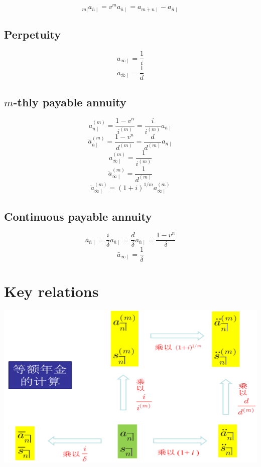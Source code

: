 \documentclass[
]{book}
\begin{document}
\[_{m|}a_{\overline{n}\mid}=v^ma_{\overline{n}\mid}=a_{\overline{m+n}\mid}-a_{\overline{n}\mid}\]

\hypertarget{perpetuity}{%
\subsection*{Perpetuity}\label{perpetuity}}

\[a_{\overline{\infty}\mid}=\frac{1}{i}\]
\[\ddot{a}_{\overline{\infty}\mid}=\frac{1}{d}\]

\hypertarget{m-thly-payable-annuity}{%
\subsection*{\texorpdfstring{\(m\)-thly payable annuity}{m-thly payable annuity}}\label{m-thly-payable-annuity}}

\[a^{(m)}_{\overline{n}\mid}=\frac{1-v^n}{i^{(m)}}=\frac{i}{i^{(m)}}a_{\overline{n}\mid}\]
\[\ddot{a}^{(m)}_{\overline{n}\mid}=\frac{1-v^n}{d^{(m)}}=\frac{d}{d^{(m)}}a_{\overline{n}\mid}\]
\[a^{(m)}_{\overline{\infty}\mid}=\frac{1}{i^{(m)}}\]
\[\ddot{a}^{(m)}_{\overline{\infty}\mid}=\frac{1}{d^{(m)}}\]
\[\ddot{a}^{(m)}_{\overline{\infty}\mid}=(1+i)^{1/m}a^{(m)}_{\overline{\infty}\mid}\]

\hypertarget{continuous-payable-annuity}{%
\subsection*{Continuous payable annuity}\label{continuous-payable-annuity}}

\[\bar{a}_{\overline{n}\mid}=\frac{i}{\delta}{a}_{\overline{n}\mid}=\frac{d}{\delta}\ddot{a}_{\overline{n}\mid}=\frac{1-v^n}{\delta}\]
\[\bar{a}_{\overline{\infty}\mid}=\frac{1}{\delta}\]

\hypertarget{key-relations}{%
\section{Key relations}\label{key-relations}}

\includegraphics[width=18.4in]{./plots/annuity-1}
\end{document}
